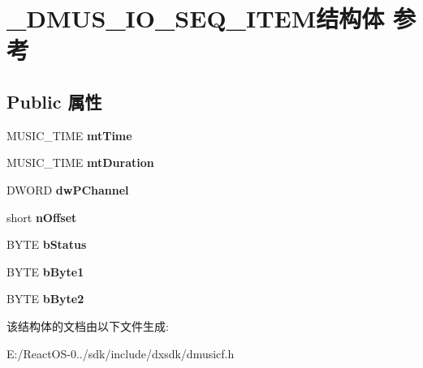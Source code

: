 \hypertarget{struct___d_m_u_s___i_o___s_e_q___i_t_e_m}{}\section{\+\_\+\+D\+M\+U\+S\+\_\+\+I\+O\+\_\+\+S\+E\+Q\+\_\+\+I\+T\+E\+M结构体 参考}
\label{struct___d_m_u_s___i_o___s_e_q___i_t_e_m}
\subsection*{Public 属性}
\begin{DoxyCompactItemize}
\item 
\mbox{\label{struct___d_m_u_s___i_o___s_e_q___i_t_e_m_a5730858167dd7f2357844affab87f99e}} 
M\+U\+S\+I\+C\+\_\+\+T\+I\+ME {\bfseries mt\+Time}
\item 
\mbox{\label{struct___d_m_u_s___i_o___s_e_q___i_t_e_m_aa59132423e9d4355beb5fe1b6498e426}} 
M\+U\+S\+I\+C\+\_\+\+T\+I\+ME {\bfseries mt\+Duration}
\item 
\mbox{\label{struct___d_m_u_s___i_o___s_e_q___i_t_e_m_a142ba1e866d0fb71a6461fe4eac55fdb}} 
D\+W\+O\+RD {\bfseries dw\+P\+Channel}
\item 
\mbox{\label{struct___d_m_u_s___i_o___s_e_q___i_t_e_m_ae4510dbc37e6a452a48de59299a80dac}} 
short {\bfseries n\+Offset}
\item 
\mbox{\label{struct___d_m_u_s___i_o___s_e_q___i_t_e_m_a898a635a07cef77b3732c126f15d0be9}} 
B\+Y\+TE {\bfseries b\+Status}
\item 
\mbox{\label{struct___d_m_u_s___i_o___s_e_q___i_t_e_m_af4ce09c1972eb0c73a30fcc29fed419b}} 
B\+Y\+TE {\bfseries b\+Byte1}
\item 
\mbox{\label{struct___d_m_u_s___i_o___s_e_q___i_t_e_m_a4bf6016adbdc62e6667f83570b138455}} 
B\+Y\+TE {\bfseries b\+Byte2}
\end{DoxyCompactItemize}


该结构体的文档由以下文件生成\+:\begin{DoxyCompactItemize}
\item 
E\+:/\+React\+O\+S-\/0../sdk/include/dxsdk/dmusicf.\+h\end{DoxyCompactItemize}
